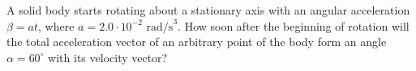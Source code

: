 
\item A solid body starts rotating about a stationary axis with an angular acceleration $\beta = at$, where $a = 2.0 \cdot 10^{-2} \text{ rad/s}^3$. How soon after the beginning of rotation will the total acceleration vector of an arbitrary point of the body form an angle $\alpha = 60^\circ$ with its velocity vector?
